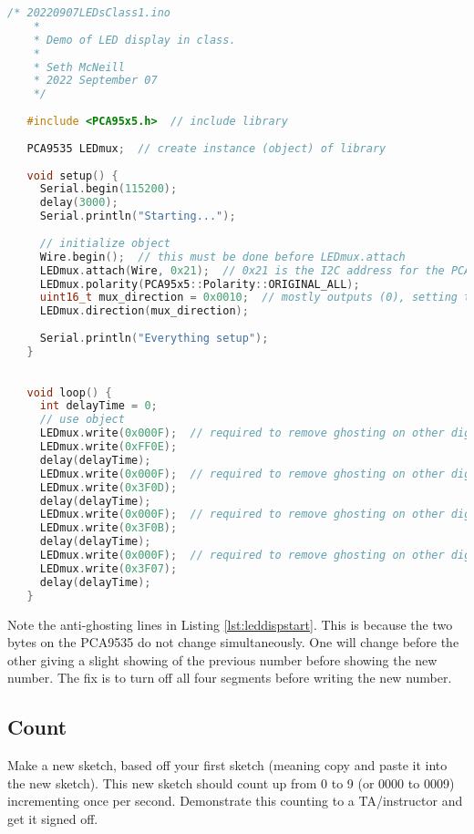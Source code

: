 \begin{lstlisting}[language=C++, caption={This listing is a starting point for driving the LED display. 
    This sketch may also be available on Canvas. Beware of copying out of PDFs since some characters
     (underscore for instance) come through garbled.},label={lst:leddispstart}]
    /* 20220907LEDsClass1.ino
    *  
    * Demo of LED display in class.
    * 
    * Seth McNeill
    * 2022 September 07
    */
   
   #include <PCA95x5.h>  // include library
   
   PCA9535 LEDmux;  // create instance (object) of library
   
   void setup() {
     Serial.begin(115200);
     delay(3000);
     Serial.println("Starting...");
   
     // initialize object
     Wire.begin();  // this must be done before LEDmux.attach
     LEDmux.attach(Wire, 0x21);  // 0x21 is the I2C address for the PCA9535 attached to the LEDs
     LEDmux.polarity(PCA95x5::Polarity::ORIGINAL_ALL);
     uint16_t mux_direction = 0x0010;  // mostly outputs (0), setting to 1 designates input
     LEDmux.direction(mux_direction);
   
     Serial.println("Everything setup");
   }
   
   
   void loop() {
     int delayTime = 0;
     // use object
     LEDmux.write(0x000F);  // required to remove ghosting on other digits
     LEDmux.write(0xFF0E);
     delay(delayTime); 
     LEDmux.write(0x000F);  // required to remove ghosting on other digits
     LEDmux.write(0x3F0D);
     delay(delayTime); 
     LEDmux.write(0x000F);  // required to remove ghosting on other digits
     LEDmux.write(0x3F0B);
     delay(delayTime); 
     LEDmux.write(0x000F);  // required to remove ghosting on other digits
     LEDmux.write(0x3F07);
     delay(delayTime); 
   }
\end{lstlisting}
Note the anti-ghosting lines in Listing \ref{lst:leddispstart}. This is because the two
bytes on the PCA9535 do not change simultaneously. One will change before the other 
giving a slight showing of the previous number before showing the new number. The fix 
is to turn off all four segments before writing the new number.
    
\subsection{Count}
Make a new sketch, based off your first sketch (meaning copy and paste it into the new sketch).
This new sketch should count up from 0 to 9 (or 0000 to 0009) incrementing once per second. Demonstrate
this counting to a TA/instructor and get it signed off.

